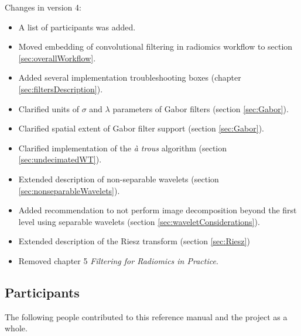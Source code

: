 \documentclass[fleqn,a4paper,oneside,openany]{book}
\begin{document}
\noindent Changes in version 4:
\begin{itemize}
    \item A list of participants was added.
    \item Moved embedding of convolutional filtering in radiomics workflow to section \ref{sec:overallWorkflow}.
    \item Added several implementation troubleshooting boxes (chapter \ref{sec:filtersDescription}).
    \item Clarified units of $\sigma$ and $\lambda$ parameters of Gabor filters (section \ref{sec:Gabor}).
    \item Clarified spatial extent of Gabor filter support (section \ref{sec:Gabor}).
    \item Clarified implementation of the \emph{\`{a} trous} algorithm (section \ref{sec:undecimatedWT}).
    \item Extended description of non-separable wavelets (section \ref{sec:nonseparableWavelets}).
    \item Added recommendation to not perform image decomposition beyond the first level using separable wavelets (section \ref{sec:waveletConsiderations}).
    \item Extended description of the Riesz transform (section \ref{sec:Riesz})
    \item Removed chapter 5 \emph{Filtering for Radiomics in Practice}.
\end{itemize}

\subsection*{Participants}
The following people contributed to this reference manual and the project as a whole.
\end{document}
